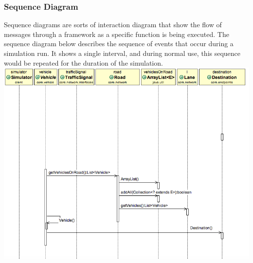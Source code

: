 \subsubsection{Sequence Diagram}

Sequence diagrams are sorts of interaction diagram that show the flow of messages through a framework as a specific function is being executed. The sequence diagram below describes the sequence of events that occur during a simulation run. It shows a single interval, and during normal use, this sequence would be repeated for the duration of the simulation. \\
\includegraphics[scale=0.4]{./images/interaction.png}








	